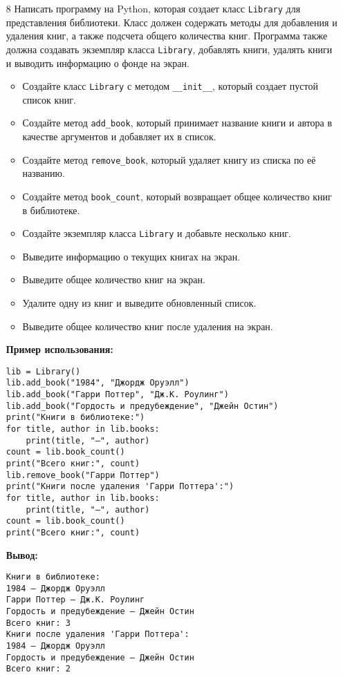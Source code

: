 \begin{enumerate}
\item[8] Написать программу на Python, которая создает класс \texttt{Library} для представления библиотеки. Класс должен содержать методы для добавления и удаления книг, а также подсчета общего количества книг. Программа также должна создавать экземпляр класса \texttt{Library}, добавлять книги, удалять книги и выводить информацию о фонде на экран.

\begin{itemize}
    \item Создайте класс \texttt{Library} с методом \texttt{\_\_init\_\_}, который создает пустой список книг.
    \item Создайте метод \texttt{add\_book}, который принимает название книги и автора в качестве аргументов и добавляет их в список.
    \item Создайте метод \texttt{remove\_book}, который удаляет книгу из списка по её названию.
    \item Создайте метод \texttt{book\_count}, который возвращает общее количество книг в библиотеке.
    \item Создайте экземпляр класса \texttt{Library} и добавьте несколько книг.
    \item Выведите информацию о текущих книгах на экран.
    \item Выведите общее количество книг на экран.
    \item Удалите одну из книг и выведите обновленный список.
    \item Выведите общее количество книг после удаления на экран.
\end{itemize}

\textbf{Пример использования:}

\begin{verbatim}
lib = Library()
lib.add_book("1984", "Джордж Оруэлл")
lib.add_book("Гарри Поттер", "Дж.К. Роулинг")
lib.add_book("Гордость и предубеждение", "Джейн Остин")
print("Книги в библиотеке:")
for title, author in lib.books:
    print(title, "—", author)
count = lib.book_count()
print("Всего книг:", count)
lib.remove_book("Гарри Поттер")
print("Книги после удаления 'Гарри Поттера':")
for title, author in lib.books:
    print(title, "—", author)
count = lib.book_count()
print("Всего книг:", count)
\end{verbatim}

\textbf{Вывод:}
\begin{verbatim}
Книги в библиотеке:
1984 — Джордж Оруэлл
Гарри Поттер — Дж.К. Роулинг
Гордость и предубеждение — Джейн Остин
Всего книг: 3
Книги после удаления 'Гарри Поттера':
1984 — Джордж Оруэлл
Гордость и предубеждение — Джейн Остин
Всего книг: 2
\end{verbatim}


\end{enumerate}
